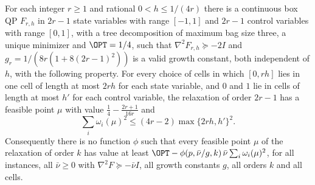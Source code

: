 \begin{proposition}\label{lim:prop:moments}
For each integer $r\ge1$ and rational $0<h\le1/(4r)$ there is a continuous box
QP $F_{r,h}$ in $2r-1$ state variables with range $[-1,1]$ and $2r-1$ control
variables with range $[0,1]$, with a tree decomposition of maximum bag size
three, a unique minimizer and $\OPT=1/4$, such that
$\nabla^2F_{r,h}\succeq-2I$ and $g_r=1/(8r(1+8(2r-1)^2))$ is a valid growth
constant, both independent of $h$, with the following property. For every
choice of cells in which $[0,rh]$ lies in one cell of length at most $2rh$ for
each state variable, and $0$ and $1$ lie in cells of length at most $h'$ for
each control variable, the relaxation of order $2r-1$ has a feasible point
$\mu$ with value $\frac14-\frac{2r+1}{16r}$ and
\[
\sum_i\omega_i(\mu)^2\le(4r-2)\max\{2rh,h'\}^2 .
\]
Consequently there is no function $\phi$ such that every feasible point $\mu$
of the relaxation of order $k$ has value at least
$\OPT-\phi(p,\bar\nu/g,k)\,\bar\nu\sum_i\omega_i(\mu)^2$, for all instances,
all $\bar\nu\ge0$ with $\nabla^2F\succeq-\bar\nu I$, all growth constants $g$,
all orders $k$ and all cells.
\end{proposition}

